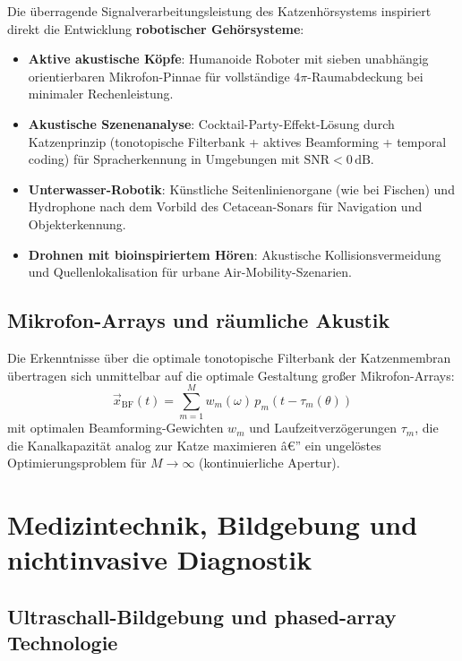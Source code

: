 ﻿\documentclass[12pt,a4paper,titlepage]{report}
\begin{document}
Die überragende Signalverarbeitungsleistung des Katzenhörsystems inspiriert
direkt die Entwicklung \textbf{robotischer Gehörsysteme}:
\begin{itemize}[leftmargin=2em]
    \item \textbf{Aktive akustische Köpfe}: Humanoide Roboter mit sieben
        unabhängig orientierbaren Mikrofon-Pinnae für vollständige $4\pi$-Raumabdeckung
        bei minimaler Rechenleistung.
    \item \textbf{Akustische Szenenanalyse}: Cocktail-Party-Effekt-Lösung
        durch Katzenprinzip (tonotopische Filterbank + aktives Beamforming +
        temporal coding) für Spracherkennung in Umgebungen mit $\text{SNR} < 0\,\text{dB}$.
    \item \textbf{Unterwasser-Robotik}: Künstliche Seitenlinienorgane (wie bei
        Fischen) und Hydrophone nach dem Vorbild des Cetacean-Sonars für
        Navigation und Objekterkennung.
    \item \textbf{Drohnen mit bioinspiriertem Hören}: Akustische Kollisionsvermeidung
        und Quellenlokalisation für urbane Air-Mobility-Szenarien.
\end{itemize}

\subsection{Mikrofon-Arrays und räumliche Akustik}

Die Erkenntnisse über die optimale tonotopische Filterbank der Katzenmembran
übertragen sich unmittelbar auf die optimale Gestaltung großer Mikrofon-Arrays:
\[
    \vec{x}_{\text{BF}}(t) = \sum_{m=1}^{M} w_m(\omega)\, p_m(t - \tau_m(\theta))
\]
mit optimalen Beamforming-Gewichten $w_m$ und Laufzeitverzögerungen $\tau_m$, die
die Kanalkapazität analog zur Katze maximieren â€” ein ungelöstes Optimierungsproblem
für $M \to \infty$ (kontinuierliche Apertur).

\section{Medizintechnik, Bildgebung und nichtinvasive Diagnostik}

\subsection{Ultraschall-Bildgebung und phased-array Technologie}
\end{document}
